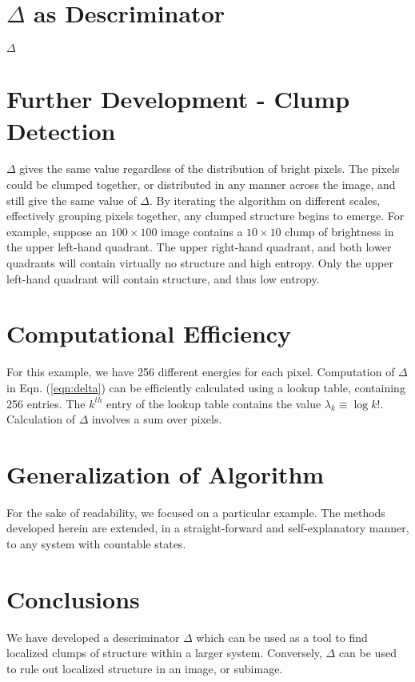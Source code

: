 \documentclass[11pt]{article} %
\begin{document}
\section{$\Delta$ as Descriminator}

$\Delta$

\section{Further Development - Clump Detection}

$\Delta$ gives the same value regardless of the distribution of bright pixels.
The pixels could be clumped together, or distributed in any manner across the image, and still give the same value of $\Delta$.
By iterating the algorithm on different scales, effectively grouping pixels together, any clumped structure begins to emerge.
For example, suppose an $100 \times 100$ image contains a $10 \times 10$ clump of brightness in the upper left-hand quadrant.
The upper right-hand quadrant, and both lower quadrants will contain virtually no structure and high entropy.
Only the upper left-hand quadrant will contain structure, and thus low entropy.

\section{Computational Efficiency}

For this example, we have 256 different energies for each pixel.
Computation of $\Delta$ in Eqn. (\ref{eqn:delta}) can be efficiently calculated using a lookup table, containing 256 entries.
The $k^{th}$ entry of the lookup table contains the value $ \lambda_{k} \equiv \log k!$.
Calculation of $\Delta$ involves a sum over pixels.

\section{Generalization of Algorithm}

For the sake of readability, we focused on a particular example.
The methods developed herein are extended, in a straight-forward and self-explanatory manner, to any system with countable states.

\section{Conclusions}

We have developed a descriminator $\Delta$ which can be used as a tool to find localized clumps of structure within a larger system.
Conversely, $\Delta$ can be used to rule out localized structure in an image, or subimage.
\end{document}
